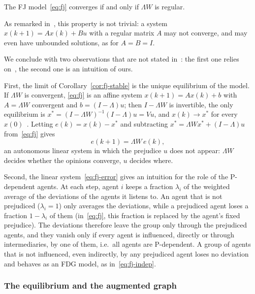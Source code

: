 \begin{corollary}
\label{cor:fj-regular}
The FJ model~\eqref{eq:fj} converges if and only if $\Lambda W$ is regular.
\end{corollary}

As remarked in~\cite{proskurnikov2017tutorial}, this property is not trivial: a system
$x(k+1) = A x(k) + B u$ with a regular matrix $A$ may not converge, and may even have
unbounded solutions, as for $A = B = I$.

We conclude with two observations that are not stated
in~\cite{proskurnikov2017tutorial}: the first one relies on~\cite{bullo2024lns}, the
second one is an intuition of ours.

First, the limit of Corollary~\ref{cor:fj-stable} is the unique equilibrium of the
model. If $\Lambda W$ is convergent, \eqref{eq:fj} is an affine system
$x(k+1) = A x(k) + b$ with $A = \Lambda W$ convergent and $b = (I - \Lambda)u$; then
$I - \Lambda W$ is invertible, the only equilibrium is
$x^* = (I - \Lambda W)^{-1}(I - \Lambda)u = Vu$, and $x(k) \to x^*$ for every
$x(0)$~\cite{bullo2024lns}. Letting $e(k) = x(k) - x^*$ and subtracting
$x^* = \Lambda W x^* + (I - \Lambda)u$ from~\eqref{eq:fj} gives
\begin{equation}\label{eq:fj-error}
  e(k+1) = \Lambda W\, e(k),
\end{equation}
an autonomous linear system in which the prejudice $u$ does not appear: $\Lambda W$
decides whether the opinions converge, $u$ decides where.

Second, the linear system~\eqref{eq:fj-error} gives an intuition for the role of the
P-dependent agents. At each step, agent $i$ keeps a fraction $\lambda_i$ of the
weighted average of the deviations of the agents it listens to. An agent that is not
prejudiced ($\lambda_i = 1$) only averages the deviations, while a prejudiced agent
loses a fraction $1-\lambda_i$ of them (in~\eqref{eq:fj}, this fraction is replaced by
the agent's fixed prejudice). The deviations therefore leave the group only through
the prejudiced agents, and they vanish only if every agent is influenced, directly or
through intermediaries, by one of them, i.e.\ all agents are P-dependent. A group of
agents that is not influenced, even indirectly, by any prejudiced agent loses no
deviation and behaves as an FDG model, as in~\eqref{eq:fj-indep}.

\subsubsection{The equilibrium and the augmented graph}
\label{subsubsec:fj-equilibrium}

